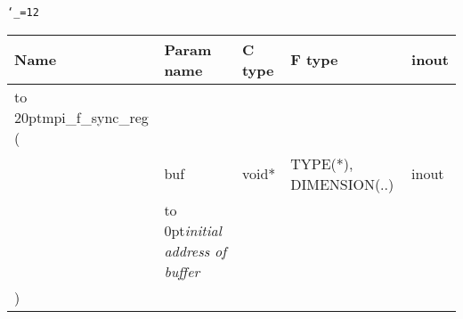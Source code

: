 \begingroup\tt\catcode`\_=12
\begin{tabular}{lllll}
\toprule
\textrm{Name}&\textrm{Param name}&\textrm{C type}&\textrm{F type}&\textrm{inout}\\
\midrule
\hbox to 20pt{mpi_f_sync_reg (\hss} \\
&buf&void*&TYPE(*), DIMENSION(..)&inout\\ [-3pt]
&\hbox to 0pt{\footnotesize\sl initial address of buffer\hss}\\
)\\
\bottomrule
\end{tabular}
\endgroup

